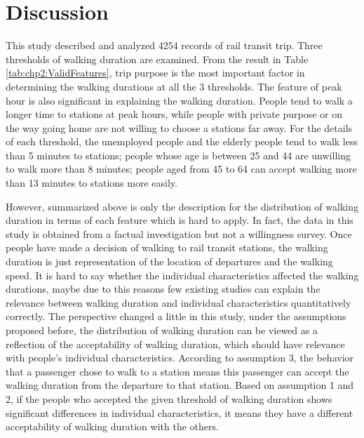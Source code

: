 %
\section{Discussion}
This study described and analyzed 4254 records of rail transit trip. Three thresholds of walking duration are examined. From the result in Table \ref{tab:chp2:ValidFeatures}, trip purpose is the most important factor in determining the walking durations at all the 3 thresholds. The feature of peak hour is also significant in explaining the walking duration. People tend to walk a longer time to stations at peak hours, while people with private purpose or on the way going home are not willing to choose a stations far away. For the details of each threshold, the unemployed people and the elderly people tend to walk less than 5 minutes to stations; people whose age is between 25 and 44 are unwilling to walk more than 8 minutes; people aged from 45 to 64 can accept walking more than 13 minutes to stations more easily.

%
However, summarized above is only the description for the distribution of walking duration in terms of each feature which is hard to apply. In fact, the data in this study is obtained from a factual investigation but not a willingness survey. Once people have made a decision of walking to rail transit stations, the walking duration is just representation of the location of departures and the walking speed. It is hard to say whether the individual characteristics affected the walking durations, maybe due to this reasons few existing studies can explain the relevance between walking duration and individual characteristics quantitatively correctly. The perspective changed a little in this study, under the assumptions proposed before, the distribution of walking duration can be viewed as a reflection of the acceptability of walking duration, which should have relevance with people's individual characteristics. According to assumption 3, the behavior that a passenger chose to walk to a station means this passenger can accept the walking duration from the departure to that station. Based on assumption 1 and 2, if the people who accepted the given threshold of walking duration shows significant differences in individual characteristics, it means they have a different acceptability of walking duration with the others.

